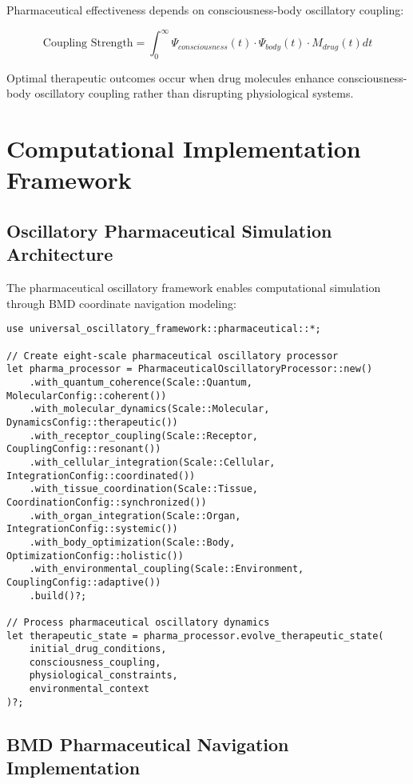 \documentclass[12pt,a4paper]{article}
\begin{document}
Pharmaceutical effectiveness depends on consciousness-body oscillatory coupling:

\begin{equation}
\text{Coupling Strength} = \int_0^{\infty} \Psi_{consciousness}(t) \cdot \Psi_{body}(t) \cdot M_{drug}(t) dt
\end{equation}

Optimal therapeutic outcomes occur when drug molecules enhance consciousness-body oscillatory coupling rather than disrupting physiological systems.

\section{Computational Implementation Framework}

\subsection{Oscillatory Pharmaceutical Simulation Architecture}

The pharmaceutical oscillatory framework enables computational simulation through BMD coordinate navigation modeling:

\begin{verbatim}
use universal_oscillatory_framework::pharmaceutical::*;

// Create eight-scale pharmaceutical oscillatory processor
let pharma_processor = PharmaceuticalOscillatoryProcessor::new()
    .with_quantum_coherence(Scale::Quantum, MolecularConfig::coherent())
    .with_molecular_dynamics(Scale::Molecular, DynamicsConfig::therapeutic())
    .with_receptor_coupling(Scale::Receptor, CouplingConfig::resonant())
    .with_cellular_integration(Scale::Cellular, IntegrationConfig::coordinated())
    .with_tissue_coordination(Scale::Tissue, CoordinationConfig::synchronized())
    .with_organ_integration(Scale::Organ, IntegrationConfig::systemic())
    .with_body_optimization(Scale::Body, OptimizationConfig::holistic())
    .with_environmental_coupling(Scale::Environment, CouplingConfig::adaptive())
    .build()?;

// Process pharmaceutical oscillatory dynamics
let therapeutic_state = pharma_processor.evolve_therapeutic_state(
    initial_drug_conditions,
    consciousness_coupling,
    physiological_constraints,
    environmental_context
)?;
\end{verbatim}

\subsection{BMD Pharmaceutical Navigation Implementation}
\end{document}
